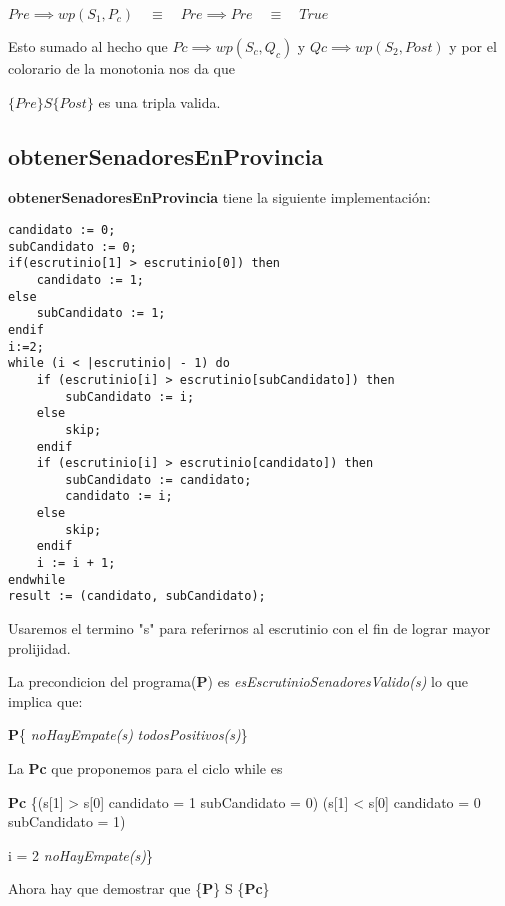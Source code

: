 \documentclass[10pt,a4paper]{article}
\begin{document}
	$Pre \implies wp(S_1,P_c) \quad \equiv \quad Pre \implies Pre \quad \equiv \quad True $

	\vspace{0.5cm}
    Esto sumado al hecho que $Pc \implies wp(S_c,Q_c)$ y $Qc \implies wp(S_2,Post)$ y por el colorario de la monotonia nos da que
	
	$\{Pre\}S\{Post\}$ es una tripla valida.

\pagebreak

\subsection{obtenerSenadoresEnProvincia}

\textbf{obtenerSenadoresEnProvincia} tiene la siguiente implementación:

\begin{lstlisting}
candidato := 0;
subCandidato := 0;
if(escrutinio[1] > escrutinio[0]) then
    candidato := 1;
else
    subCandidato := 1;
endif
i:=2;
while (i < |escrutinio| - 1) do
	if (escrutinio[i] > escrutinio[subCandidato]) then
		subCandidato := i;
	else
		skip;
	endif
	if (escrutinio[i] > escrutinio[candidato]) then
	    subCandidato := candidato;
	    candidato := i;
	else
		skip;
	endif
	i := i + 1;
endwhile
result := (candidato, subCandidato);
\end{lstlisting}
 
\vspace{5mm}
    
    Usaremos el termino "s" para referirnos al escrutinio con el fin de lograr mayor prolijidad.
    
    
    La precondicion del programa(\textbf{P}) es {\textit{esEscrutinioSenadoresValido(s)}} lo que implica que:
    
   \textbf{P}\equiv \{  \wedge \textit{noHayEmpate(s) }\wedge  \textit{todosPositivos(s)}\}

    La \textbf{Pc} que proponemos para el ciclo while es
    
    \vspace{5mm}
    
    \textbf{Pc} \equiv \{(s[1] > s[0] \wedge candidato = 1 \wedge subCandidato = 0) \lor  (s[1] < s[0] \wedge candidato = 0 \wedge subCandidato = 1) \wedge 
    
    i = 2 \wedge \textit{noHayEmpate(s)}\}

    \vspace{5mm}

    Ahora hay que demostrar que \{\textbf{P}\} S \{\textbf{Pc}\}
\end{document}
